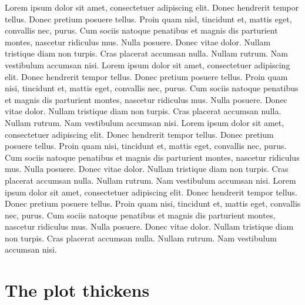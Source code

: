 \documentclass[12pt]{report}
\begin{document}
Lorem ipsum dolor sit amet, consectetuer adipiscing elit. Donec
hendrerit tempor tellus. Donec pretium posuere tellus. Proin quam
nisl, tincidunt et, mattis eget, convallis nec, purus. Cum sociis
natoque penatibus et magnis dis parturient montes, nascetur ridiculus
mus. Nulla posuere. Donec vitae dolor. Nullam tristique diam non
turpis. Cras placerat accumsan nulla. Nullam rutrum. Nam vestibulum
accumsan nisi.  Lorem ipsum dolor sit amet, consectetuer adipiscing
elit. Donec hendrerit tempor tellus. Donec pretium posuere
tellus. Proin quam nisi, tincidunt et, mattis eget, convallis nec,
purus. Cum sociis natoque penatibus et magnis dis parturient montes,
nascetur ridiculus mus. Nulla posuere. Donec vitae dolor. Nullam
tristique diam non turpis. Cras placerat accumsan nulla. Nullam
rutrum. Nam vestibulum accumsan nisi.  Lorem ipsum dolor sit amet,
consectetuer adipiscing elit. Donec hendrerit tempor tellus. Donec
pretium posuere tellus. Proin quam nisi, tincidunt et, mattis eget,
convallis nec, purus. Cum sociis natoque penatibus et magnis dis
parturient montes, nascetur ridiculus mus. Nulla posuere. Donec vitae
dolor. Nullam tristique diam non turpis. Cras placerat accumsan
nulla. Nullam rutrum. Nam vestibulum accumsan nisi.  Lorem ipsum dolor
sit amet, consectetuer adipiscing elit. Donec hendrerit tempor
tellus. Donec pretium posuere tellus. Proin quam nisi, tincidunt et,
mattis eget, convallis nec, purus. Cum sociis natoque penatibus et
magnis dis parturient montes, nascetur ridiculus mus. Nulla
posuere. Donec vitae dolor. Nullam tristique diam non turpis. Cras
placerat accumsan nulla. Nullam rutrum. Nam vestibulum accumsan nisi.
  
\chapter{The plot thickens}
\end{document}
